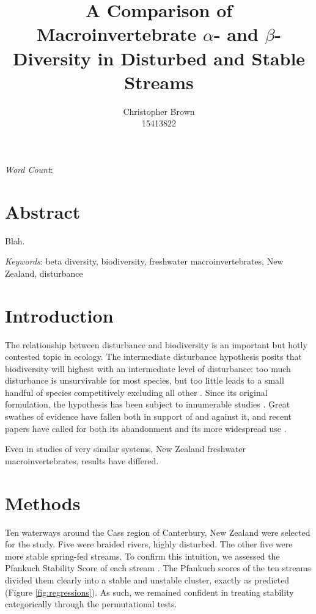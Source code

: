 \documentclass[a4paper,10pt]{article}
\title{A Comparison of Macroinvertebrate $\alpha$- and $\beta$-Diversity in Disturbed and Stable Streams}
\author{
	Christopher Brown\\15413822
}
\date{}
\begin{document}
\maketitle

\begin{center}
	\emph{Word Count}: %
\end{center}

\section*{Abstract}

Blah.

\bigskip\noindent\emph{Keywords}:
beta diversity,
biodiversity,
freshwater macroinvertebrates,
New Zealand,
disturbance

\clearpage

\section*{Introduction}

The relationship between disturbance and biodiversity is an important but hotly contested topic in ecology.
The intermediate disturbance hypothesis posits that biodiversity will highest with an intermediate level of disturbance: too much disturbance is unsurvivable for most species, but too little leads to a small handful of species competitively excluding all other \parencite{idh-original}.
Since its original formulation, the hypothesis has been subject to innumerable studies \parencite{disturbance-diversity-predict-test}.
Great swathes of evidence have fallen both in support of and against it, and recent papers have called for both its abandonment \parencite{idh-abandon} and its more widespread use \parencite{idh-patch-dynamics}.

Even in studies of very similar systems, New Zealand freshwater macroinvertebrates, results have differed.

\section*{Methods}

Ten waterways around the Cass region of Canterbury, New Zealand were selected for the study.
Five were braided rivers, highly disturbed.
The other five were more stable spring-fed streams.
To confirm this intuition, we assessed the Pfankuch Stability Score of each stream \parencite{pfankuch, pfankuch-doc}.
The Pfankuch scores of the ten streams divided them clearly into a stable and unstable cluster, exactly as predicted (Figure \ref{fig:regressions}).
As such, we remained confident in treating stability categorically through the permutational tests.
\end{document}

